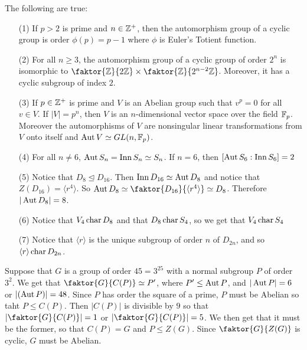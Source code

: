 \begin{theorem}\label{theorem_4.4.6}
  The following are true:
  \begin{enumerate}
    \item[(1)] If $p>2$ is prime and $n \in \mathbb{Z}^+$, then the automorphism
      group of a cyclic group is order $\phi(p)=p-1$ where $\phi$ is
      Euler's Totient function.

    \item[(2)] For all $n \geq 3$, the automorphism group of a cyclic group
      of order  $2^n$ is isomorphic to  $\faktor{\Z}{2\Z} \times
      \faktor{\Z}{2^{n-2}\Z}$. Moreover, it has a cyclic subgroup of index
      $2$.

    \item[(3)] If $p \in \mathbb{Z}^+$ is prime and $V$ is an Abelian group such
      that  $v^p=0$ for all $v \in V$. If  $|V|=p^n$, then $V$ is an
      $n$-dimensional vector space over the field  $\mathbb{F}_p$. Moreover the
      automorphisms of $V$ are nonsingular linear transformations from $V$
      onto itself and  $\operatorname{Aut}{V} \simeq GL(n,\mathbb{F}_p)$.

    \item[(4)] For all $n \neq 6$,  $\operatorname{Aut}{S_n}=\operatorname{Inn}{S_n} \simeq S_n$. If
      $n=6$, then $[\operatorname{Aut}{S_6}:\operatorname{Inn}{S_6}]=2$

    \item[(5)] Notice that $D_8 \unlhd D_{16}$. Then $\operatorname{Inn}{D_{16}} \simeq
      \operatorname{Aut}{D_8}$ and notice that $Z(D_{16})= \langle r^4 \rangle$. So
      $\Aut{D_8} \simeq \faktor{D_{16}}{\langle r^4 \rangle} \simeq D_8$.
      Therefore $|\operatorname{Aut}{D_8}|=8$.

    \item[(6)] Notice that $V_4 \operatorname{char} D_8$ and that $D_8 \operatorname{char} S_4$, so we
      get that $V_4 \operatorname{char} S_4$

    \item[(7)] Notice that $\langle r \rangle$ is the unique subgroup of
      order $n$ of  $D_{2n}$, and so $\langle r \rangle \operatorname{char} D_{2n}$.
  \end{enumerate}
\end{theorem}

\begin{example}\label{example_4.12}
  Suppose that $G$ is a group of order  $45=3^25$ with a normal subgroup $P$
  of order $3^2$. We get that  $\faktor{G}{C(P)} \simeq P'$, where $P' \leq
  \operatorname{Aut}{P}$, and $|\operatorname{Aut}{P}|=6$ or $|(\operatorname{Aut}{P})|=48$. Since $P$ has
  order the square of a prime,  $P$ must be Abelian so taht  $P \leq C(P)$.
  Then $|C(P)|$ is divisible by $9$ so that $|\faktor{G}{C(P)}|=1$ or
  $|\faktor{G}{C(P)}|=5$. We then get that it must be the former, so that
  $C(P)=G$ and $P \leq Z(G)$. Since $\faktor{G}{Z(G)}$ is cyclic, $G$ must be
  Abelian.
\end{example}

